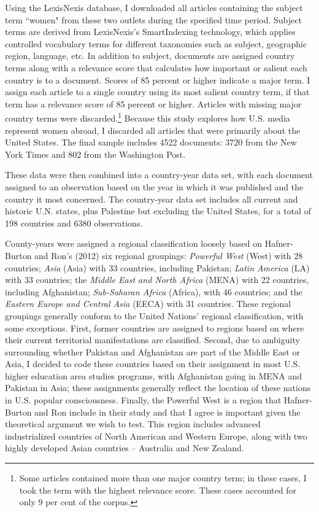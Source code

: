 \documentclass[11pt, oneside]{article}
\begin{document}
Using the LexisNexis database, I downloaded all articles containing the subject term ``women" from these two outlets during the specified time period. Subject terms are derived from LexisNexis's SmartIndexing technology, which applies controlled vocabulary terms for different taxonomies such as subject, geographic region, language, etc. In addition to subject, documents are assigned country terms along with a relevance score that calculates how important or salient each country is to a document. Scores of 85 percent or higher indicate a major term. I assign each article to a single country using its most salient country term, if that term has a relevance score of 85 percent or higher. Articles with missing major country terms were discarded.\footnote{\hspace{5}Some articles contained more than one major country term; in these cases, I took the term with the highest relevance score. These cases accounted for only 9 per cent of the corpus.}  Because this study explores how U.S. media represent women abroad, I discarded all articles that were primarily about the United States. The final sample includes 4522 documents: 3720 from the New York Times and 802 from the Washington Post. 

These data were then combined into a country-year data set, with each document assigned to an observation based on the year in which it was published and the country it most concerned. The country-year data set includes all current and historic U.N. states, plus Palestine but excluding the United States, for a total of 198 countries and 6380 observations. 

County-years were assigned a regional classification loosely based on Hafner-Burton and Ron's (2012) six regional groupings: \emph{Powerful West} (West) with 28 countries; \emph{Asia} (Asia) with 33 countries, including Pakistan; \emph{Latin America} (LA) with 33 countries; the \emph{Middle East and North Africa} (MENA) with 22 countries, including Afghanistan; \emph{Sub-Saharan Africa} (Africa), with 46 countries; and the \emph{Eastern Europe and Central Asia} (EECA) with 31 countries. These regional groupings generally conform to the United Nations' regional classification, with some exceptions. First, former countries are assigned to regions based on where their current territorial manifestations are classified. Second, due to ambiguity surrounding whether Pakistan and Afghanistan are part of the Middle East or Asia, I decided to code these countries based on their assignment in most U.S. higher education area studies programs, with Afghanistan going in MENA and Pakistan in Asia; these assignments generally reflect the location of these nations in U.S. popular consciousness. Finally, the Powerful West is a region that Hafner-Burton and Ron include in their study and that I agree is important given the theoretical argument we wish to test. This region includes advanced industrialized countries of North American and Western Europe, along with two highly developed Asian countries -- Australia and New Zealand.
\end{document}
